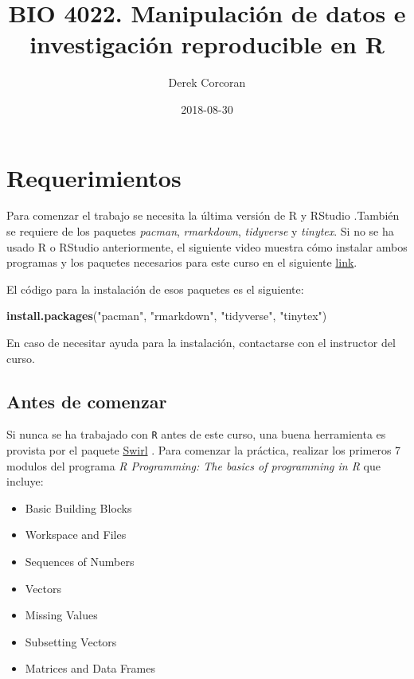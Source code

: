 \documentclass[]{book}
\title{BIO 4022. Manipulación de datos e investigación reproducible en R}
\author{Derek Corcoran}
\date{2018-08-30}
\newenvironment{Shaded}{\begin{snugshade}}{\end{snugshade}}
\newcommand{\KeywordTok}[1]{\textcolor[rgb]{0.13,0.29,0.53}{\textbf{#1}}}
\newcommand{\NormalTok}[1]{#1}
\newcommand{\StringTok}[1]{\textcolor[rgb]{0.31,0.60,0.02}{#1}}
\providecommand{\tightlist}{%
  \setlength{\itemsep}{0pt}\setlength{\parskip}{0pt}}
\begin{document}
\maketitle

{
\setcounter{tocdepth}{1}
\tableofcontents
}
\hypertarget{requerimientos}{%
\chapter*{Requerimientos}\label{requerimientos}}

Para comenzar el trabajo se necesita la última versión de R y RStudio
\citep{R-base}.También se requiere de los paquetes \emph{pacman},
\emph{rmarkdown}, \emph{tidyverse} y \emph{tinytex}. Si no se ha usado R
o RStudio anteriormente, el siguiente video muestra cómo instalar ambos
programas y los paquetes necesarios para este curso en el siguiente
\href{https://youtu.be/RtkCAKXsVbw}{link}.

El código para la instalación de esos paquetes es el siguiente:

\begin{Shaded}
\begin{Highlighting}[]
\KeywordTok{install.packages}\NormalTok{(}\StringTok{"pacman"}\NormalTok{, }\StringTok{"rmarkdown"}\NormalTok{, }\StringTok{"tidyverse"}\NormalTok{, }\StringTok{"tinytex"}\NormalTok{)}
\end{Highlighting}
\end{Shaded}

En caso de necesitar ayuda para la instalación, contactarse con el
instructor del curso.

\hypertarget{antes-de-comenzar}{%
\section{Antes de comenzar}\label{antes-de-comenzar}}

Si nunca se ha trabajado con \texttt{R} antes de este curso, una buena
herramienta es provista por el paquete
\href{http://swirlstats.com/students.html}{Swirl} \citep{Kross2017}.
Para comenzar la práctica, realizar los primeros 7 modulos del programa
\emph{R Programming: The basics of programming in R} que incluye:

\begin{itemize}
\tightlist
\item
  Basic Building Blocks
\item
  Workspace and Files
\item
  Sequences of Numbers
\item
  Vectors
\item
  Missing Values
\item
  Subsetting Vectors
\item
  Matrices and Data Frames
\end{itemize}
\end{document}
